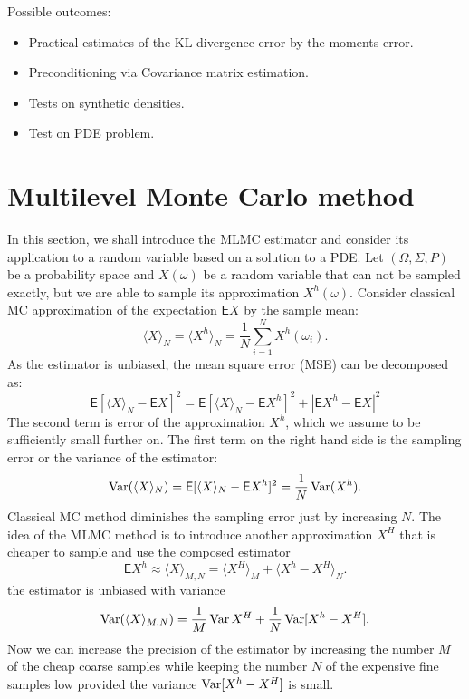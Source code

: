 \documentclass{article}
\def \E{{\mathsf E}}
\def\avg#1{\langle#1\rangle}
\def\Var{\mathop{\rm Var}}
\def\abs#1{|#1|}
\begin{document}
Possible outcomes:
\begin{itemize}
    \item Practical estimates of the KL-divergence error by the moments error.
    \item Preconditioning via Covariance matrix estimation.
    \item Tests on synthetic densities.
    \item Test on PDE problem.
\end{itemize}

\section{Multilevel Monte Carlo method}
In this section, we shall introduce the MLMC estimator and consider its application to a random variable based on a solution to a PDE.
Let $(\Omega, \Sigma, P)$ be a probability space and $X(\omega)$ be a random variable
that can not be sampled exactly, but we are able to sample its approximation $X^h(\omega)$. 
Consider classical MC approximation of the expectation $\E X$ by the sample mean:
\[
    \avg{X}_N = \avg{X^h}_N = \frac{1}{N}\sum_{i=1}^{N} X^h(\omega_i).
\]
As the estimator is unbiased, the mean square error (MSE) can be decomposed as:
\begin{equation}
    \label{eq:mc_mse}
    \E[\avg{X}_N - \E X]^2 = \E[\avg{X}_N - \E X^h ]^2 + \abs{\E X^h - \E X}^2
\end{equation}
The second term is error of the approximation $X^h$, which we assume to be sufficiently small further on.
The first term on the right hand side is the sampling error or the variance of the estimator:
\[
    \Var(\avg{X}_N) = \E[\avg{X}_N - \E X^h ]^2 = \frac{1}{N}\Var(X^h).
\]
 Classical MC method diminishes the sampling error just by increasing $N$. The idea of the MLMC method is to introduce another approximation $X^H$ that is cheaper to sample and use the composed estimator
\[
	\E X^h \approx \avg{X}_{M,N} = \avg{X^H}_M	 + \avg{X^h - X^H}_N. 
\]
the estimator is unbiased with variance
\[
	\Var(\avg{X}_{M,N}) =  \frac{1}{M}\Var{X^H} + \frac{1}{N}\Var[X^h-X^H]. 
\]
Now we can increase the precision of the estimator by increasing the number $M$ of the cheap coarse samples while keeping the number $N$ of the expensive fine samples low provided the variance
$\Var[X^h-X^H]$ is small. 
\end{document}

